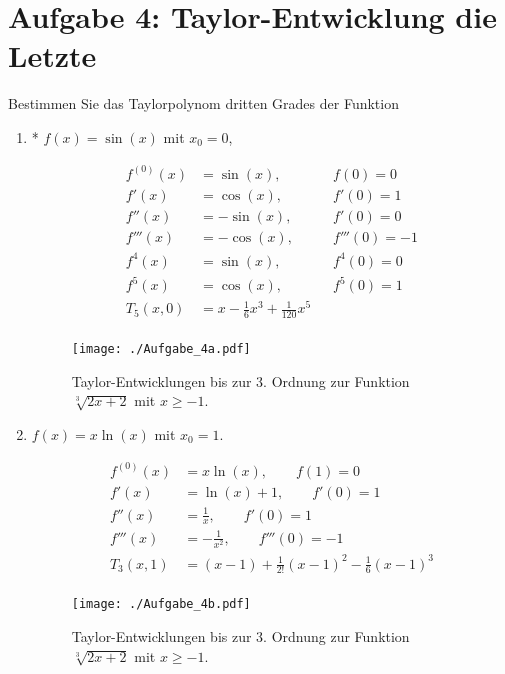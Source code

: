 \documentclass[11pt,a4paper, parskip=half ]{report}
\begin{document}
  \section*{Aufgabe 4:  Taylor-Entwicklung die Letzte}
  Bestimmen Sie das Taylorpolynom dritten Grades der Funktion \begin{enumerate}
    \item* $f(x) = \sin(x)$ mit $x_0 = 0$,
    
    \vspace{20pt}
  \begin{align*}
  f^{(0)}(x) &= \sin(x), \qquad &f(0) = 0 \\ 
  f'(x)      &= \cos(x), \qquad &f'(0) = 1 \\
  f''(x)     &= -\sin(x), \qquad &f'(0) = 0 \\
  f'''(x)    &= -\cos(x), \qquad &f'''(0) = -1 \\
  f^{4}(x)    &= \sin(x), \qquad &f^{4}(0) = 0 \\
  f^{5}(x)    &= \cos(x), \qquad &f^{5}(0) = 1 \\
  T_5 (x, 0) &= x - \frac{1}{6} x^3 + \frac{1}{120} x^5  &\\
  \end{align*}

  \begin{figure}
    \centering
    \texttt{[image: ./Aufgabe\_4a.pdf]}
    \caption{Taylor-Entwicklungen bis zur 3. Ordnung zur Funktion $\sqrt[3]{2x+2}$ mit $x\geq -1$.}
    \label{fig:feynman2}
  \end{figure}

    \item $f(x) = x \ln(x)$ mit $x_0 = 1$. 
    
    \vspace{20pt}
    \begin{align*}
    f^{(0)}(x) &= x \ln(x), \qquad f(1) = 0 \\ 
    f'(x)      &= \ln(x) + 1, \qquad f'(0) = 1 \\
    f''(x)     &= \frac{1}{x}, \qquad f'(0) = 1 \\
    f'''(x)    &= -\frac{1}{x^2} , \qquad f'''(0) = -1 \\
    T_3 (x, 1) &= (x -1) + \frac{1}{2!} (x-1)^2 - \frac{1}{6} (x-1)^3 \\
    \end{align*}

    \begin{figure}
      \centering
      \texttt{[image: ./Aufgabe\_4b.pdf]}
      \caption{Taylor-Entwicklungen bis zur 3. Ordnung zur Funktion $\sqrt[3]{2x+2}$ mit $x\geq -1$.}
      \label{fig:feynman2}
    \end{figure}

  \end{enumerate}
\end{document}
